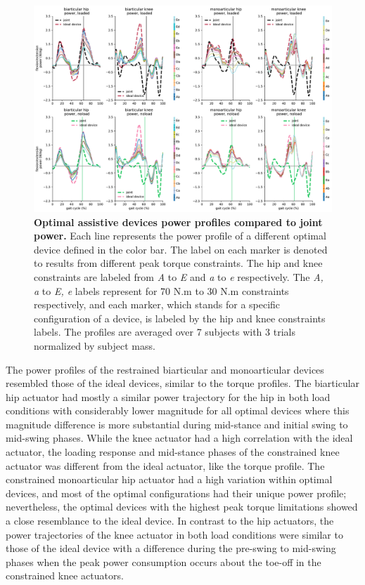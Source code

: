 \documentclass[10pt,letterpaper]{article}
\begin{document}
\begin{figure}[ht]   
	\centering
	\includegraphics[width=\linewidth]{Pareto_Simulations_Figures/PaperFigure_Paretofront_PowerProfiles.pdf}
	\vspace{1mm}
		\caption{{\small\textbf{Optimal assistive devices power profiles compared to joint power.} Each line represents the power profile of a different optimal device defined in the color bar. The label on each marker is denoted to results from different peak torque constraints. The hip and knee constraints are labeled from {\it A} to {\it E} and {\it a} to {\it e} respectively. The {\it A, a} to {\it E, e} labels represent for 70 N.m to 30 N.m constraints respectively, and each marker, which stands for a specific configuration of a device, is labeled by the hip and knee constraints labels. The profiles are averaged over 7 subjects with 3 trials normalized by subject mass.}}
	\label{Fig_Paretofronts_Power_Profiles}
\end{figure}
\vspace{2mm}
The power profiles of the restrained biarticular and monoarticular devices resembled those of the ideal devices, similar to the torque profiles. The biarticular hip actuator had mostly a similar power trajectory for the hip in both load conditions with considerably lower magnitude for all optimal devices where this magnitude difference is more substantial during mid-stance and initial swing to mid-swing phases. While the knee actuator had a high correlation with the ideal actuator, the loading response and mid-stance phases of the constrained knee actuator was different from the ideal actuator, like the torque profile. The constrained monoarticular hip actuator had a high variation within optimal devices, and most of the optimal configurations had their unique power profile; nevertheless, the optimal devices with the highest peak torque limitations showed a close resemblance to the ideal device. In contrast to the hip actuators, the power trajectories of the knee actuator in both load conditions were similar to those of the ideal device with a difference during the pre-swing to mid-swing phases when the peak power consumption occurs about the toe-off in the constrained knee actuators.\\
\end{document}
